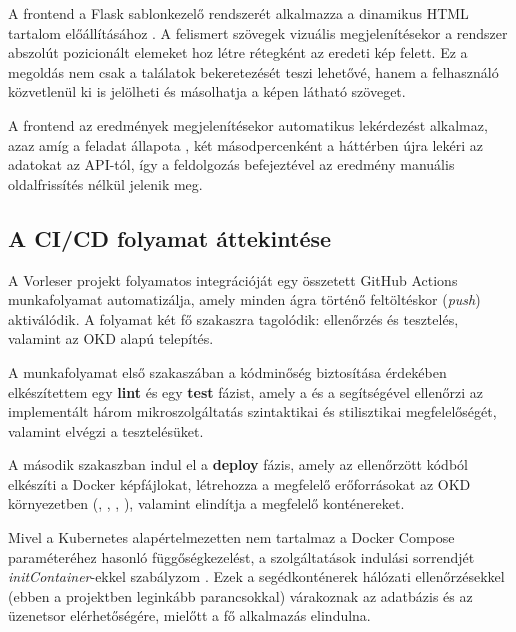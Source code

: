 \documentclass[12pt]{article}
\begin{document}
	A frontend a Flask sablonkezelő rendszerét alkalmazza a dinamikus HTML tartalom előállításához \cite{flask-templates}. A felismert szövegek vizuális megjelenítésekor a rendszer abszolút pozicionált  elemeket hoz létre rétegként az eredeti kép felett. Ez a megoldás nem csak a találatok bekeretezését teszi lehetővé, hanem a felhasználó közvetlenül ki is jelölheti és másolhatja a képen látható szöveget.
	
	A frontend az eredmények megjelenítésekor automatikus lekérdezést alkalmaz, azaz amíg a feladat állapota , két másodpercenként a háttérben újra lekéri az adatokat az API-tól, így a feldolgozás befejeztével az eredmény manuális oldalfrissítés nélkül jelenik meg.
	
	\subsection{A CI/CD folyamat áttekintése}
	A Vorleser projekt folyamatos integrációját egy összetett GitHub Actions munkafolyamat automatizálja, amely minden  ágra történő feltöltéskor (\textit{push}) aktiválódik. A folyamat két fő szakaszra tagolódik: ellenőrzés és tesztelés, valamint az OKD alapú telepítés.
	
	A munkafolyamat első szakaszában a kódminőség biztosítása érdekében elkészítettem egy \textbf{lint} és egy \textbf{test} fázist, amely a  és a  segítségével ellenőrzi az implementált három mikroszolgáltatás szintaktikai és stilisztikai megfelelőségét, valamint elvégzi a tesztelésüket.
	
	A második szakaszban indul el a \textbf{deploy} fázis, amely az ellenőrzött kódból elkészíti a Docker képfájlokat, létrehozza a megfelelő erőforrásokat az OKD környezetben (, , , ), valamint elindítja a megfelelő konténereket.
	
	Mivel a Kubernetes alapértelmezetten nem tartalmaz a Docker Compose  paraméteréhez hasonló függőségkezelést, a szolgáltatások indulási sorrendjét \textit{initContainer}-ekkel szabályzom \cite{k8s-dependencies}. Ezek a segédkonténerek hálózati ellenőrzésekkel (ebben a projektben leginkább  parancsokkal) várakoznak az adatbázis és az üzenetsor elérhetőségére, mielőtt a fő alkalmazás elindulna.
	
\end{document}
